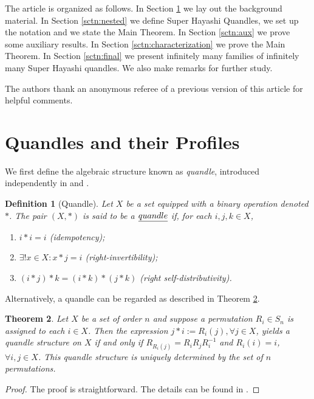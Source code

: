 \documentclass{article}
\newtheorem{theorem}{Theorem}[section]
\newtheorem{definition}[theorem]{Definition}
\begin{document}
The article is organized as follows. In Section \ref{sctn:background} we lay out the background material. In Section \ref{sctn:nested} we define Super Hayashi Quandles, we set up the notation and we state the Main Theorem. In Section \ref{sctn:aux} we prove some auxiliary results. In Section \ref{sctn:characterization} we prove the Main Theorem. In Section \ref{sctn:final} we present infinitely many families of infinitely many Super Hayashi quandles. We also make remarks for further study.


The authors thank an anonymous referee of a previous version of this article for helpful comments.

\section{Quandles and their Profiles}\label{sctn:background}

We first define the algebraic structure known as \emph{quandle}, introduced independently in \cite{Joyce} and \cite{Matveev}.

\begin{definition}[Quandle]\label{def:quandle}
Let $X$ be a set equipped with a binary operation denoted $*$. The pair $(X,*)$ is said to be a $\emph{quandle}$ if, for each $i, j, k\in X$,
\begin{enumerate}
\item $i*i=i$ (idempotency);
\item $\exists ! x\in X: x*j=i$ (right-invertibility);
\item $(i*j)*k=(i*k)*(j*k)$ (right self-distributivity).
\end{enumerate}
\end{definition}

Alternatively, a quandle can be regarded as described in  Theorem \ref{thm:equivdef}.




\begin{theorem}\label{thm:equivdef}
Let $X$ be a set of order $n$ and suppose a permutation $R_i\in S_n$ is assigned to each $i\in X$. Then the expression $j*i:= R_i(j), \forall  j \in X$, yields a quandle structure on $X$ if and only if $R_{ R_i(j)}=  R_i R_j R_i^{-1}$ and $R_i(i)=i$, $\forall i, j\in X$. This quandle structure is uniquely determined by the set of $n$ permutations.
\end{theorem}

\begin{proof}
The proof is straightforward. The details can be found in \cite{Brieskorn}.
\end{proof}
\end{document}
